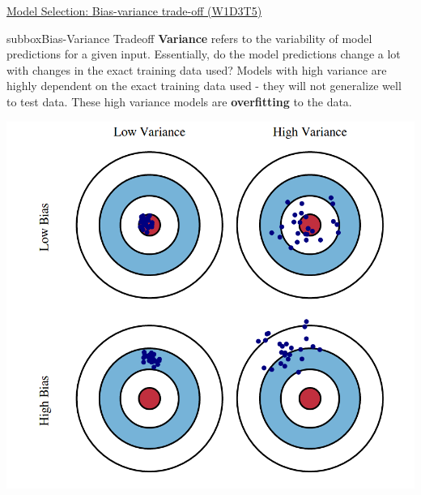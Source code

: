 \begin{textbox}{\href{https://compneuro.neuromatch.io/tutorials/W1D3_ModelFitting/student/W1D3_Tutorial5.html}{Model Selection: Bias-variance trade-off (W1D3T5)}  }
\begin{subbox}{subbox}{Bias-Variance Tradeoff}
\textbf{Variance} refers to the variability of model predictions for a given input. Essentially, do the model predictions change a lot with changes in the exact training data used? Models with high variance are highly dependent on the exact training data used - they will not generalize well to test data. These high variance models are \textbf{overfitting} to the data.

\centering
\includegraphics[scale=0.13]{Figures/ModelFitting/MFFigure6.png}
\end{subbox}
\end{textbox}